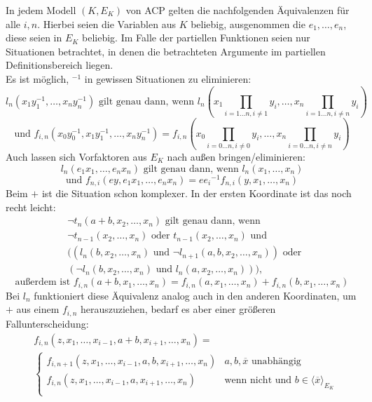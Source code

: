     \begin{fact}\label{Eliminierungsregeln}
    	In jedem Modell $(K,E_K)$ von ACP gelten die nachfolgenden Äquivalenzen für alle $i,n$. Hierbei seien die Variablen aus $K$ beliebig, ausgenommen die $e_1,\dots,e_n$, diese seien in $E_K$ beliebig. Im Falle der partiellen Funktionen seien nur Situationen betrachtet, in denen die betrachteten Argumente im partiellen Definitionsbereich liegen.\\
    	Es ist möglich, \glqq{}$^{-1}$\grqq{} in gewissen Situationen zu eliminieren:
    	$$l_n(x_1y_1^{-1},\dots,x_ny_n^{-1})\text{ gilt genau dann, wenn }l_n\left(x_1\prod\limits_{i=1\dots n,i\neq 1}y_i,\dots,x_n\prod\limits_{i=1\dots n,i\neq n}y_i\right)$$
    	$$\text{und }f_{i,n}(x_0y_0^{-1},x_1y_1^{-1},\dots,x_ny_n^{-1})= f_{i,n}\left(x_0\prod\limits_{i=0\dots n,i\neq 0}y_i,\dots,x_n\prod\limits_{i=0\dots n,i\neq n}y_i\right)$$
    	Auch lassen sich Vorfaktoren aus $E_K$ nach außen bringen/eliminieren:
    	$$l_n(e_1x_1,\dots,e_nx_n)\text{ gilt genau dann, wenn }l_n(x_1,\dots,x_n)$$
    	$$\text{und }f_{n,i}(ey,e_1x_1,\dots,e_nx_n)=e{e_i}^{-1}f_{n,i}(y,x_1,\dots,x_n)$$
    	Beim \glqq{}$+$\grqq{} ist die Situation schon komplexer. In der ersten Koordinate ist das noch recht leicht:
    	\begin{align*}
    	&\neg t_n(a+b,x_2,\dots,x_n)\text{ gilt genau dann, wenn }\\&\neg t_{n-1}(x_2,\dots,x_n)\text{ oder }t_{n-1}(x_2,\dots,x_n)\text{ und }\\&((l_n(b,x_2,\dots,x_n)\text{ und }\neg l_{n+1}(a,b,x_2,\dots,x_n))\text{ oder }\\&(\neg l_n(b,x_2,\dots,x_n)\text{ und }l_n(a,x_2,\dots,x_n))),
    	\end{align*}
    	$$\text{außerdem ist }f_{i,n}(a+b,x_1,\dots,x_n)=f_{i,n}(a,x_1,\dots,x_n)+f_{i,n}(b,x_1,\dots,x_n)$$\newpage
    	Bei $l_n$ funktioniert diese Äquivalenz analog auch in den anderen Koordinaten, um \glqq{}$+$\grqq{} aus einem $f_{i,n}$ herauszuziehen, bedarf es aber einer größeren Fallunterscheidung:
    	\begin{align*}
    	&f_{i,n}(z,x_1,\dots,x_{i-1},a+b,x_{i+1},\dots,x_n)=\\
    	&\left\{\begin{array}{ll}
    	f_{i,n+1}(z,x_1,\dots,x_{i-1},a,b,x_{i+1},\dots,x_n)& a,b,\overline{x}\text{ unabhängig}\\
    	f_{i,n}(z,x_1,\dots,x_{i-1},a,x_{i+1},\dots,x_n)&\text{wenn nicht und }b\in\langle\overline{x}\rangle_{E_K}\\

\end{array}
\end{align*}
\end{fact}
